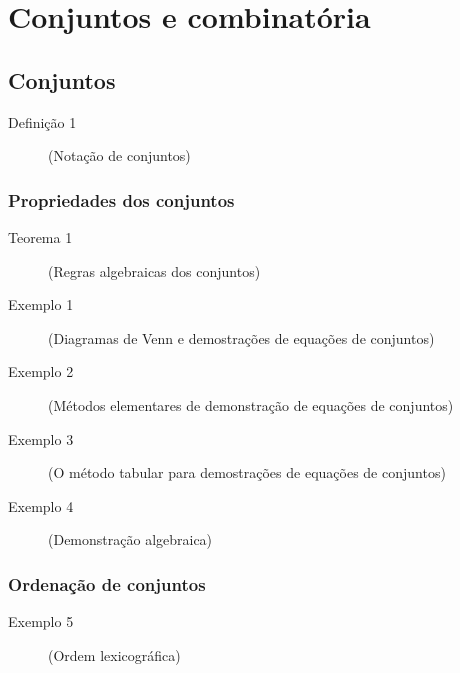 \chapter{Conjuntos e combinatória}

\section{Conjuntos}

\begin{description}
	\item[Definição 1] (Notação de conjuntos)
\end{description}

\subsection{Propriedades dos conjuntos}

\begin{description}
	\item[Teorema 1] (Regras algebraicas dos conjuntos)
\end{description}

\begin{description}
	\item[Exemplo 1] (Diagramas de Venn e demostrações de equações de conjuntos)
\end{description}

\begin{description}
	\item[Exemplo 2] (Métodos elementares de demonstração de equações de conjuntos)
\end{description}

\begin{description}
	\item[Exemplo 3] (O método tabular para demostrações de equações de conjuntos)
\end{description}

\begin{description}
	\item[Exemplo 4] (Demonstração algebraica)
\end{description}

\subsection{Ordenação de conjuntos}

\begin{description}
	\item[Exemplo 5] (Ordem lexicográfica)
\end{description}

